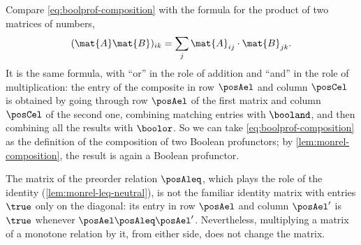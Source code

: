Compare \cref{eq:boolprof-composition} with the formula for the product of two matrices of numbers,
\begin{equation}
    (\mat{A}\mat{B})_{ik} = \sum_{j} \mat{A}_{ij} \cdot \mat{B}_{jk}.
\end{equation}
It is the same formula, with ``or'' in the role of addition and ``and'' in the role of multiplication: the entry of the composite in row $\posAel$ and column $\posCel$ is obtained by going through row $\posAel$ of the first matrix and column $\posCel$ of the second one, combining matching entries with $\booland$, and then combining all the results with $\boolor$.
So we can take \cref{eq:boolprof-composition} as the definition of the composition of two Boolean profunctors; by \cref{lem:monrel-composition}, the result is again a Boolean profunctor.

The matrix of the preorder relation $\posAleq$, which plays the role of the identity (\cref{lem:monrel-leq-neutral}), is not the familiar identity matrix with entries $\true$ only on the diagonal: its entry in row $\posAel$ and column $\posAel'$ is $\true$ whenever $\posAel \posAleq \posAel'$.
Nevertheless, multiplying a matrix of a monotone relation by it, from either side, does not change the matrix.

